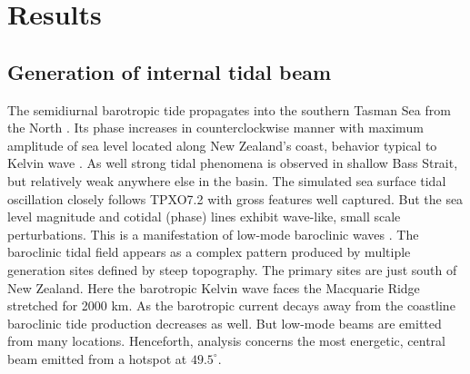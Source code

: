 \documentclass[12pt]{article}
\begin{document}
\section{Results}
\subsection{Generation of internal tidal beam}
The semidiurnal barotropic tide propagates into the southern Tasman Sea from the North 
. Its phase increases in counterclockwise manner with maximum amplitude of sea 
level located along 
New Zealand's coast, behavior typical to Kelvin wave \citep{walters2001ocean}. As well 
strong tidal phenomena is observed in shallow Bass Strait, but relatively weak anywhere else in the 
basin. 
The simulated sea surface tidal oscillation closely follows TPXO7.2 with gross 
features well captured. But the sea level magnitude and cotidal (phase) lines exhibit wave-like, 
small scale perturbations. This is a manifestation of low-mode baroclinic waves 
. The baroclinic tidal field appears as a complex pattern produced by multiple 
generation sites defined by steep topography. The primary sites are just south of 
New Zealand. Here the barotropic Kelvin wave faces the Macquarie Ridge stretched for 2000 km. As 
the barotropic current decays away from the coastline baroclinic tide production decreases as well. 
But low-mode beams are emitted from many locations. Henceforth, analysis concerns the 
most energetic, central beam emitted from a hotspot at $49.5^{\circ}$.\\
\end{document}
